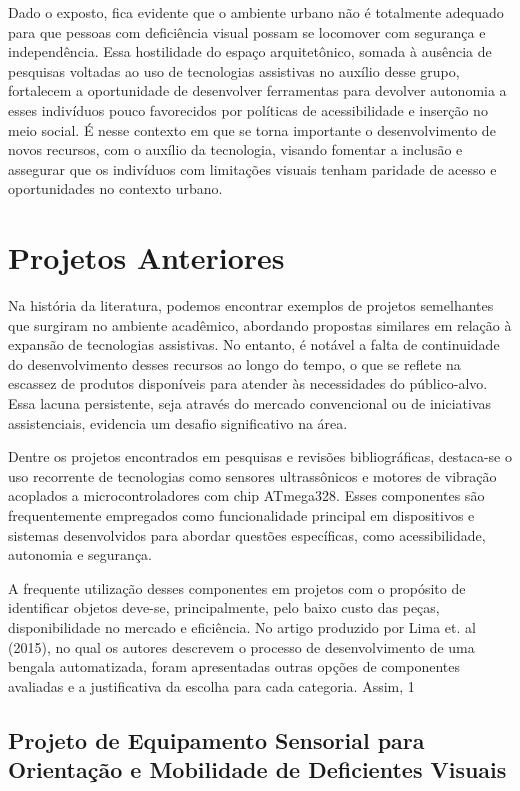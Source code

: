 Dado o exposto, fica evidente que o ambiente urbano não é totalmente adequado para que pessoas com deficiência visual possam se locomover com segurança e independência. Essa hostilidade do espaço arquitetônico, somada à ausência de pesquisas voltadas ao uso de tecnologias assistivas no auxílio desse grupo, fortalecem a oportunidade de desenvolver ferramentas para devolver autonomia a esses indivíduos pouco favorecidos por políticas de acessibilidade e inserção no meio social. É nesse contexto em que se torna importante o desenvolvimento de novos recursos, com o auxílio da tecnologia, visando fomentar a inclusão e assegurar que os indivíduos com limitações visuais tenham paridade de acesso e oportunidades no contexto urbano.

\section{Projetos Anteriores}
Na história da literatura, podemos encontrar exemplos de projetos semelhantes que surgiram no ambiente acadêmico, abordando propostas similares em relação à expansão de tecnologias assistivas. No entanto, é notável a falta de continuidade do desenvolvimento desses recursos ao longo do tempo, o que se reflete na escassez de produtos disponíveis para atender às necessidades do público-alvo. Essa lacuna persistente, seja através do mercado convencional ou de iniciativas assistenciais, evidencia um desafio significativo na área.

Dentre os projetos encontrados em pesquisas e revisões bibliográficas, destaca-se o uso recorrente de tecnologias como sensores ultrassônicos e motores de vibração acoplados a microcontroladores com chip ATmega328. Esses componentes são frequentemente empregados como funcionalidade principal em dispositivos e sistemas desenvolvidos para abordar questões específicas, como acessibilidade, autonomia e segurança.

A frequente utilização desses componentes em projetos com o propósito de identificar objetos deve-se, principalmente, pelo baixo custo das peças, disponibilidade no mercado e eficiência. No artigo produzido por Lima et. al (2015), no qual os autores descrevem o processo de desenvolvimento de uma bengala automatizada, foram apresentadas outras opções de componentes avaliadas e a justificativa da escolha para cada categoria. Assim, 1

    \subsection{Projeto de Equipamento Sensorial para Orientação e Mobilidade de Deficientes Visuais}\label{sec:citacoes}
    
